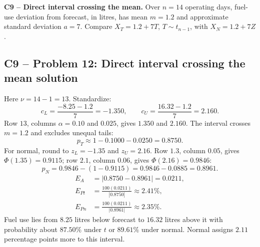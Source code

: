 {
\textbf{C9 -- Direct interval crossing the mean.} Over $n=14$ operating days, fuel-use deviation from forecast, in litres, has mean $m=1.2$ and approximate standard deviation $a=7$. Compare $X_T=1.2+7T$, $T\sim t_{n-1}$, with $X_N=1.2+7Z$.
\label{sol:q12}
\subsection*{C9 -- Problem 12: Direct interval crossing the mean solution }
Here $\nu=14-1=13$. Standardize:
\[
 c_L=\frac{-8.25-1.2}{7}=-1.350,\qquad c_U=\frac{16.32-1.2}{7}=2.160.
\]
Row $13$, columns $\alpha=0.10$ and $0.025$, gives $1.350$ and $2.160$.
The interval crosses $m=1.2$ and excludes unequal tails:
\[
 p_T\approx1-0.1000-0.0250=\boxed{0.8750}.
\]
For normal, round to $z_L=-1.35$ and $z_U=2.16$.
Row $1.3$, column $0.05$, gives $\Phi(1.35)=0.9115$; row $2.1$, column $0.06$, gives $\Phi(2.16)=0.9846$:
\[
 p_N=0.9846-(1-0.9115)=0.9846-0.0885=\boxed{0.8961}.
\]
\[
 \begin{aligned}
 E_A&=|0.8750-0.8961|=\boxed{0.0211},\\
 E_{Pt}&=\frac{100(0.0211)}{|0.8750|}\approx\boxed{2.41\%},\\
 E_{Pn}&=\frac{100(0.0211)}{|0.8961|}\approx\boxed{2.35\%}.
 \end{aligned}
\]
Fuel use lies from $8.25$ litres below forecast to $16.32$ litres above it with probability about $87.50\%$ under $t$ or $89.61\%$ under normal.
Normal assigns $2.11$ percentage points more to this interval.
\secInicio[sec:q12]
}

